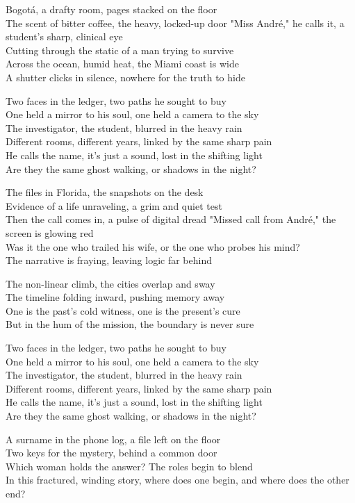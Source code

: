 \begin{lyrics}
Bogotá, a drafty room, pages stacked on the floor\\
The scent of bitter coffee, the heavy, locked-up door
"Miss André," he calls it, a student’s sharp, clinical eye\\
Cutting through the static of a man trying to survive\\
Across the ocean, humid heat, the Miami coast is wide\\
A shutter clicks in silence, nowhere for the truth to hide

Two faces in the ledger, two paths he sought to buy\\
One held a mirror to his soul, one held a camera to the sky\\
The investigator, the student, blurred in the heavy rain\\
Different rooms, different years, linked by the same sharp pain\\
He calls the name, it's just a sound, lost in the shifting light\\
Are they the same ghost walking, or shadows in the night?

The files in Florida, the snapshots on the desk\\
Evidence of a life unraveling, a grim and quiet test\\
Then the call comes in, a pulse of digital dread
"Missed call from André," the screen is glowing red\\
Was it the one who trailed his wife, or the one who probes his mind?\\
The narrative is fraying, leaving logic far behind

The non-linear climb, the cities overlap and sway\\
The timeline folding inward, pushing memory away\\
One is the past’s cold witness, one is the present's cure\\
But in the hum of the mission, the boundary is never sure

Two faces in the ledger, two paths he sought to buy\\
One held a mirror to his soul, one held a camera to the sky\\
The investigator, the student, blurred in the heavy rain\\
Different rooms, different years, linked by the same sharp pain\\
He calls the name, it's just a sound, lost in the shifting light\\
Are they the same ghost walking, or shadows in the night?

A surname in the phone log, a file left on the floor\\
Two keys for the mystery, behind a common door\\
Which woman holds the answer? The roles begin to blend\\
In this fractured, winding story, where does one begin, and where does the other end?
\end{lyrics}

